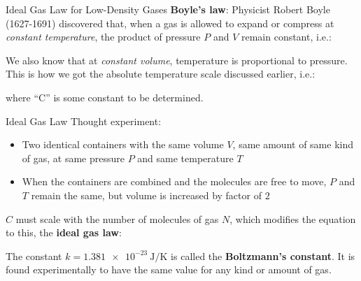 \documentclass[12pt,aspectratio=169]{beamer}
\newcommand{\eq}[2]{\vspace{#1}{\Large\begin{displaymath}#2\end{displaymath}}}
\begin{document}
\begin{frame}{Ideal Gas Law for Low-Density Gases}
  \textbf{Boyle's law}: Physicist Robert Boyle (1627-1691) discovered that,
  when a gas is allowed to expand or compress at \emph{constant temperature},
  the product of pressure $P$ and $V$ remain constant, i.e.:

  \eq{-.2in}{
    PV=\text{constant} %
  }

  \vspace{-.1in}We also know that at \emph{constant volume}, temperature is
  proportional to pressure. This is how we got the absolute temperature scale
  discussed earlier, i.e.:

  \eq{-.3in}{
    PV=CT
  }

  \vspace{-.2in}where ``C'' is some constant to be determined.
\end{frame}



\begin{frame}{Ideal Gas Law}
  Thought experiment:
  \begin{itemize}
  \item Two identical containers with the same volume $V$, same amount of same
    kind of gas, at same pressure $P$ and same temperature $T$
  \item When the containers are combined and the molecules are free to
    move, $P$ and $T$ remain the same, but volume is increased by factor of
    $2$
  \end{itemize}
  $C$ must scale with the number of molecules of gas $N$, which modifies the
  equation to this, the \textbf{ideal gas law}:

  \eq{-.25in}{
    \boxed{PV=NkT}
  }

  \vspace{-.15in}The constant $k=\SI{1.381e-23}{\joule/\kelvin}$ is called the
  \textbf{Boltzmann's constant}. It is found experimentally to have the same
  value for any kind or amount of gas.
\end{frame}
\end{document}
